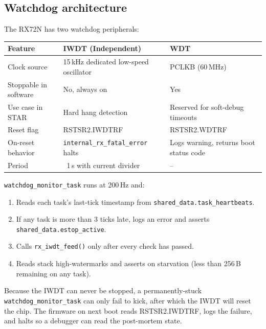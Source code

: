 \subsection{Watchdog architecture}

The RX72N has two watchdog peripherals:

\begin{center}
\begin{tabular}{|l|p{5.0cm}|p{5.5cm}|}
\hline
\textbf{Feature}        & \textbf{IWDT (Independent)}                & \textbf{WDT}                                \\
\hline
Clock source            & 15\,kHz dedicated low-speed oscillator     & PCLKB (60\,MHz)                              \\
Stoppable in software   & No, always on                              & Yes                                          \\
Use case in STAR        & Hard hang detection                        & Reserved for soft-debug timeouts             \\
Reset flag              & RSTSR2.IWDTRF                              & RSTSR2.WDTRF                                 \\
On-reset behavior       & \texttt{internal\_rx\_fatal\_error} halts  & Logs warning, returns boot status code        \\
Period                  & ~1\,s with current divider                  & --                                            \\
\hline
\end{tabular}
\end{center}

\texttt{watchdog\_monitor\_task} runs at 200\,Hz and:

\begin{enumerate}
  \item Reads each task's last-tick timestamp from
        \texttt{shared\_data.task\_heartbeats}.
  \item If any task is more than 3 ticks late, logs an error and
        asserts \texttt{shared\_data.estop\_active}.
  \item Calls \texttt{rx\_iwdt\_feed()} only after every check has
        passed.
  \item Reads stack high-watermarks and asserts on starvation
        (less than 256\,B remaining on any task).
\end{enumerate}

Because the IWDT can never be stopped, a permanently-stuck
\texttt{watchdog\_monitor\_task} can only fail to kick, after which
the IWDT will reset the chip. The firmware on next boot reads
RSTSR2.IWDTRF, logs the failure, and halts so a debugger can read
the post-mortem state.

